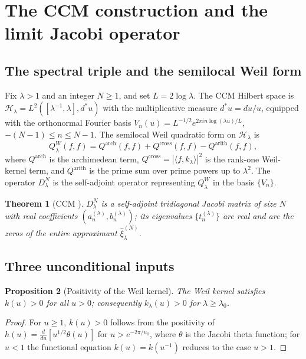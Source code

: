 \documentclass[11pt]{amsart}
\newtheorem{theorem}{Theorem}[section]
\newtheorem{proposition}[theorem]{Proposition}
\theoremstyle{definition}
\theoremstyle{remark}
\begin{document}
\section{The CCM construction and the limit Jacobi operator}\label{sec:ccm}

\subsection{The spectral triple and the semilocal Weil form}
Fix $\lambda>1$ and an integer $N\ge1$, and set $L=2\log\lambda$. The CCM Hilbert space is
$\mathcal H_\lambda=L^2([\lambda^{-1},\lambda],d^\ast u)$ with the multiplicative measure
$d^\ast u=du/u$, equipped with the orthonormal Fourier basis
$V_n(u)=L^{-1/2}e^{2\pi in\log(\lambda u)/L}$, $-(N-1)\le n\le N-1$. The semilocal Weil
quadratic form on $\mathcal H_\lambda$ is
\[
Q_\lambda^W(f,f)=Q^{\mathrm{arch}}(f,f)+Q^{\mathrm{cross}}(f,f)-Q^{\mathrm{arith}}(f,f),
\]
where $Q^{\mathrm{arch}}$ is the archimedean term, $Q^{\mathrm{cross}}=|\langle f,k_\lambda
\rangle|^2$ is the rank-one Weil-kernel term, and $Q^{\mathrm{arith}}$ is the prime sum over
prime powers up to $\lambda^2$. The operator $D_\lambda^N$ is the self-adjoint operator
representing $Q_\lambda^W$ in the basis $\{V_n\}$.

\begin{theorem}[CCM \cite{CCM}]\label{thm:ccm}
$D_\lambda^N$ is a self-adjoint tridiagonal Jacobi matrix of size $N$ with real coefficients
$(a_n^{(\lambda)},b_n^{(\lambda)})$; its eigenvalues $\{t_n^{(\lambda)}\}$ are real and are the
zeros of the entire approximant $\widehat\xi_\lambda^{(N)}$.
\end{theorem}

\subsection{Three unconditional inputs}
\begin{proposition}[Positivity of the Weil kernel]\label{prop:kpos}
The Weil kernel satisfies $k(u)>0$ for all $u>0$; consequently $k_\lambda(u)>0$ for
$\lambda\ge\lambda_0$.
\end{proposition}
\begin{proof}
For $u\ge1$, $k(u)>0$ follows from the positivity of $h(u)=\frac{d}{du}[u^{1/2}\theta(u)]$ for
$u>e^{-2\pi/u_0}$, where $\theta$ is the Jacobi theta function; for $u<1$ the functional
equation $k(u)=k(u^{-1})$ reduces to the case $u>1$.
\end{proof}
\end{document}
